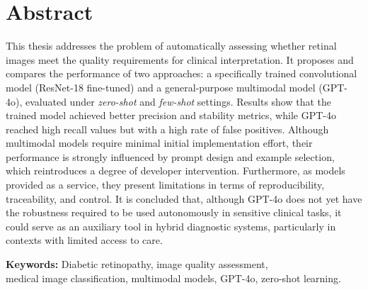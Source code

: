 \chapter*{Abstract}

\par This thesis addresses the problem of automatically assessing whether retinal images meet the quality requirements for clinical interpretation. It proposes and compares the performance of two approaches: a specifically trained convolutional model (ResNet-18 fine-tuned) and a general-purpose multimodal model (GPT-4o), evaluated under \textit{zero-shot} and \textit{few-shot} settings. Results show that the trained model achieved better precision and stability metrics, while GPT-4o reached high recall values but with a high rate of false positives. Although multimodal models require minimal initial implementation effort, their performance is strongly influenced by prompt design and example selection, which reintroduces a degree of developer intervention. Furthermore, as models provided as a service, they present limitations in terms of reproducibility, traceability, and control. It is concluded that, although GPT-4o does not yet have the robustness required to be used autonomously in sensitive clinical tasks, it could serve as an auxiliary tool in hybrid diagnostic systems, particularly in contexts with limited access to care.


\vspace{1em}
\noindent
\textbf{Keywords:} Diabetic retinopathy, image quality assessment, \\
medical image classification, multimodal models, GPT-4o, zero-shot learning.
